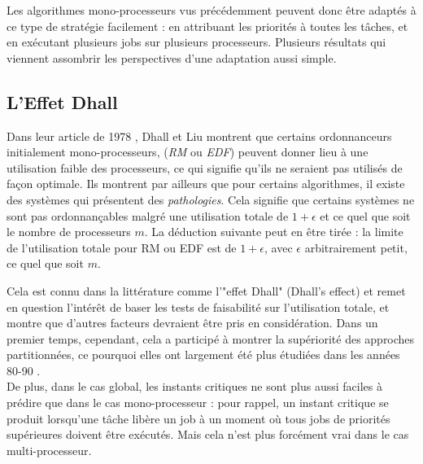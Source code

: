 \documentclass[11pt,a4paper,oneside]{report}
\begin{document}
Les algorithmes mono-processeurs vus précédemment peuvent donc être adaptés 
à ce type de stratégie facilement : en attribuant les priorités à toutes les tâches, et en 
exécutant plusieurs jobs sur plusieurs processeurs. 
Plusieurs résultats qui viennent assombrir les perspectives d'une adaptation aussi simple. \\

\subsection{L'Effet Dhall}
Dans leur article de 1978 \cite{dhall_real-time_1978}, Dhall et Liu montrent que certains ordonnanceurs 
initialement mono-processeurs, (\textit{RM} ou \textit{EDF}) peuvent donner lieu à une utilisation faible des 
processeurs, ce qui signifie qu'ils ne seraient pas utilisés de façon optimale. 
Ils montrent par ailleurs que pour certains algorithmes, 
il existe des systèmes qui présentent des \textit{pathologies}.
Cela signifie que certains systèmes ne sont pas ordonnançables malgré une 
utilisation totale de $1 + \epsilon$ et ce quel que soit le nombre de processeurs $m$.
La déduction suivante peut en être tirée : la limite de l'utilisation totale 
pour RM ou EDF est de $1 + \epsilon$, avec $\epsilon$ arbitrairement petit, ce 
quel que soit $m$.
 
Cela est connu dans la littérature comme l'"effet Dhall" (Dhall's effect) et remet en 
question l'intérêt de baser les tests de faisabilité sur l'utilisation totale, et 
montre que d'autres facteurs devraient être pris en considération. Dans un premier temps, cependant, 
cela a participé à montrer la supériorité des approches partitionnées, ce pourquoi elles ont 
largement été plus étudiées dans les années 80-90 \cite{davis_survey_2011}.\\

De plus, dans le cas global, les instants critiques ne sont plus aussi faciles à prédire 
que dans le cas mono-processeur : pour rappel, un instant critique se produit lorsqu'une tâche 
libère un job à un moment où tous jobs de priorités supérieures doivent être exécutés. 
Mais cela n'est plus forcément vrai dans le cas multi-processeur.\\
\end{document}
